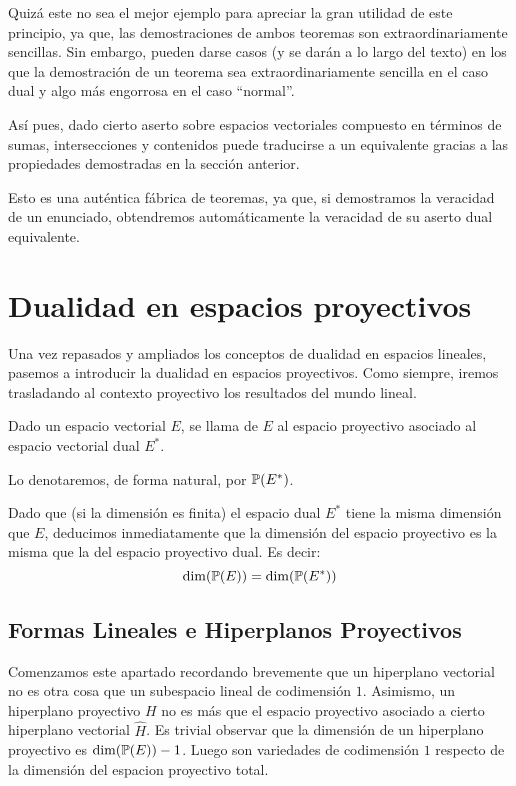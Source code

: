 Quizá este no sea el mejor ejemplo para apreciar la gran utilidad de este principio, ya que, las demostraciones de ambos teoremas son extraordinariamente sencillas. Sin embargo, pueden darse casos (y se darán a lo largo del texto) en los que la demostración de un teorema sea extraordinariamente sencilla en el caso dual y algo más engorrosa en el caso ``normal''.

Así pues, dado cierto aserto sobre espacios vectoriales compuesto en términos de sumas, intersecciones y contenidos puede traducirse a un  equivalente gracias a las propiedades demostradas en la sección anterior.

Esto es una auténtica fábrica de teoremas, ya que, si demostramos la veracidad de un enunciado, obtendremos automáticamente la veracidad de su aserto dual equivalente. 
\section{Dualidad en espacios proyectivos}
Una vez repasados y ampliados los conceptos de dualidad en espacios lineales, pasemos a introducir la dualidad en espacios proyectivos. Como siempre, iremos trasladando al contexto proyectivo los resultados del mundo lineal.
\begin{defi}
	Dado un espacio vectorial $E$, se llama  de $E$ al espacio proyectivo asociado al espacio vectorial dual $E^*$.
	
	Lo denotaremos, de forma natural, por $\mathbb{P}(E^*)$.
\end{defi}
\begin{obs}
	Dado que (si la dimensión es finita) el espacio dual $E^*$ tiene la misma dimensión que $E$, deducimos inmediatamente que la dimensión del espacio proyectivo es la misma que la del espacio proyectivo dual. Es decir:
	\begin{equation}
	\dim(\mathbb{P}(E))=\dim (\mathbb{P}(E^*))
	\end{equation}
\end{obs}

\subsection{Formas Lineales e Hiperplanos Proyectivos}

Comenzamos este apartado recordando brevemente que un hiperplano vectorial no es otra cosa que un subespacio lineal de codimensión $1$. Asimismo, un hiperplano proyectivo $H$ no es más que el espacio proyectivo asociado a cierto hiperplano vectorial $\widehat{H}$. Es trivial observar que la dimensión de un hiperplano proyectivo es $\dim(\mathbb{P}(E))-1$. Luego son variedades de codimensión $1$ respecto de la dimensión del espacion proyectivo total.\\


